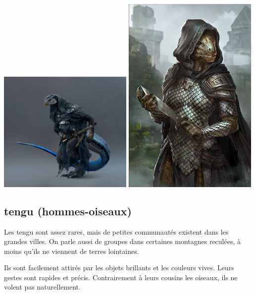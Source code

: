 \documentclass[10pt,a4paper]{book}
\begin{document}
\includegraphics[width=0.49\textwidth]{lezard 1}
\includegraphics[width=0.49\textwidth]{lezard 2}
\subsection{tengu (hommes-oiseaux)}
Les tengu sont assez rares, mais de petites communautés existent dans les grandes villes. On parle aussi de groupes dans certaines montagnes reculées, à moins qu'ils ne viennent de terres lointaines. 

Ils sont facilement attirés par les objets brillants et les couleurs vives. Leurs gestes sont rapides et précis. Contrairement à leurs cousins les oiseaux, ils ne volent pas naturellement.
\end{document}
